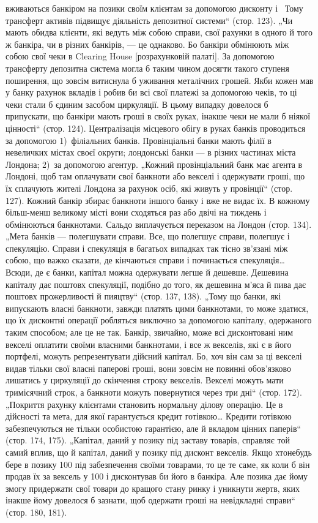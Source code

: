 вживаються банкіром на позики своїм клієнтам за
допомогою дисконту і~ Тому трансферт активів підвищує діяльність депозитної системи“ (стор.
123). „Чи мають обидва клієнти, які ведуть між собою
справи, свої рахунки в одного й того ж банкіра, чи в різних банкірів, — це
однаково. Бо банкіри обмінюють між собою свої чеки в Clearing House [розрахунковій палаті]. За
допомогою трансферту депозитна система могла б
таким чином досягти такого ступеня поширення, що зовсім витиснула б
уживання металічних грошей. Якби кожен мав у банку рахунок вкладів і робив би всі свої платежі за
допомогою чеків, то ці чеки стали б єдиним засобом циркуляції. В цьому випадку довелося б
припускати, що банкіри мають
гроші в своїх руках, інакше чеки не мали б ніякої цінності“ (стор. 124). Централізація місцевого
обігу в руках банків проводиться за допомогою 1)~філіальних банків. Провінціальні банки мають філії
в невеличких містах своєї округи;
лондонські банки — в різних частинах міста Лондона; 2)~за допомогою агентур.
„Кожний провінціальний банк має агента в Лондоні, щоб там оплачувати свої
банкноти або векселі і одержувати гроші, що їх сплачують жителі Лондона за рахунок осіб, які живуть
у провінції“ (стор. 127). Кожний банкір збирає банкноти
іншого банку і вже не видає їх. В кожному більш-менш великому місті
вони сходяться раз або двічі на тиждень і обмінюються банкнотами. Сальдо
виплачується переказом на Лондон (стор. 134). „Мета банків — полегшувати
справи. Все, що полегшує справи, полегшує і спекуляцію. Справи і спекуляція
в багатьох випадках так тісно зв’язані між собою, що важко сказати, де кінчаються справи і
починається спекуляція\dots{} Всюди, де є банки, капітал можна
одержувати легше й дешевше. Дешевина капіталу дає поштовх спекуляції,
подібно до того, як дешевина м’яса й пива дає поштовх прожерливості й пияцтву“ (стор. 137, 138).
„Тому що банки, які випускають власні банкноти, завжди
платять цими банкнотами, то може здатися, що їх дисконтні операції робляться
виключно за допомогою капіталу, одержаного таким способом; але це не так.
Банкір, звичайно, може всі дисконтовані ним векселі оплатити своїми власними
банкнотами, і все ж  векселів, які є в його портфелі, можуть репрезентувати дійсний капітал. Бо,
хоч він сам за ці векселі видав тільки свої власні паперові гроші, вони зовсім не повинні
обов’язково лишатись у циркуляції до
скінчення строку векселів. Векселі можуть мати тримісячний строк, а банкноти
можуть повернутися через три дні“ (стор. 172). „Покриття рахунку клієнтами
становить нормальну ділову операцію. Це в дійсності та мета, для якої
гарантується кредит готівкою\dots{} Кредити готівкою забезпечуються не тільки
особистою гарантією, але й вкладом цінних паперів“ (стор. 174, 175). „Капітал,
даний у позику під заставу товарів, справляє той самий вплив, що й капітал,
даний у позику під дисконт векселів. Якщо хтонебудь бере в позику 100 під забезпечення своїми товарами, то це те саме, як коли б він продав
їх за вексель у 100 і дисконтував би його в банкіра.
Але позика дає йому змогу придержати свої товари до кращого стану ринку і
уникнути жертв, яких інакше йому довелося б зазнати, щоб одержати гроші
на невідкладні справи“ (стор. 180, 181).

